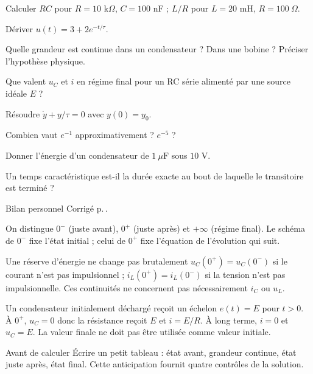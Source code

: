 
\begin{questions}
\item Calculer $RC$ pour $R=10$ k$\Omega$, $C=100$ nF ; $L/R$ pour $L=20$ mH, $R=100\ \Omega$.
\item Dériver $u(t)=3+2e^{-t/\tau}$.
\item Quelle grandeur est continue dans un condensateur ? Dans une bobine ? Préciser l’hypothèse physique.
\item Que valent $u_C$ et $i$ en régime final pour un RC série alimenté par une source idéale $E$ ?
\item Résoudre $\dot y+y/\tau=0$ avec $y(0)=y_0$.
\item Combien vaut $e^{-1}$ approximativement ? $e^{-5}$ ?
\item Donner l’énergie d’un condensateur de $1\ \mu\mathrm{ F}$ sous $10$ V.
\item Un temps caractéristique est-il la durée exacte au bout de laquelle le transitoire est terminé ?
\end{questions}
\begin{docu}{Bilan personnel}
Corrigé p.\,\pageref{corr-diag}.
\end{docu}


On distingue $0^-$ (juste avant), $0^+$ (juste après) et $+\infty$ (régime final). Le schéma de $0^-$ fixe l’état initial ; celui de $0^+$ fixe l’équation de l’évolution qui suit.
\begin{loi}{Une réserve d’énergie ne change pas brutalement}
$u_C(0^+)=u_C(0^-)$ si le courant n’est pas impulsionnel ; $i_L(0^+)=i_L(0^-)$ si la tension n’est pas impulsionnelle. Ces continuités ne concernent pas nécessairement $i_C$ ou $u_L$.
\end{loi}
Un condensateur initialement déchargé reçoit un échelon $e(t)=E$ pour $t>0$. À $0^+$, $u_C=0$ donc la résistance reçoit $E$ et $i=E/R$. À long terme, $i=0$ et $u_C=E$. La valeur finale ne doit pas être utilisée comme valeur initiale.
\begin{methode}{Avant de calculer}
Écrire un petit tableau : état avant, grandeur continue, état juste après, état final. Cette anticipation fournit quatre contrôles de la solution.
\end{methode}


